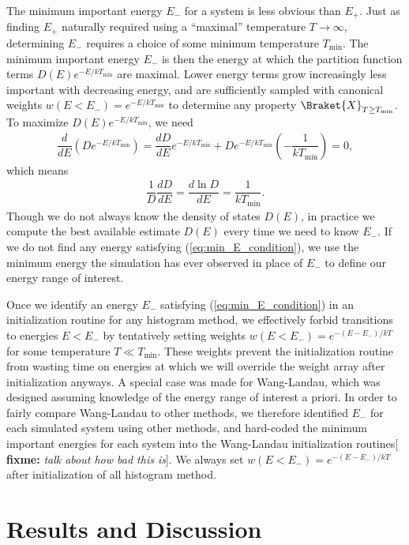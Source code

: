 \documentclass[11pt]{article}
\newcommand{\bk}{\Braket} %
\renewcommand{\t}{\text} %
\newcommand{\f}[2]{\dfrac{#1}{#2}} %
\newcommand{\p}[1]{\left(#1\right)} %
\newcommand{\red}[1]{{\bf \color{red} #1}}
\newcommand{\fixme}[1]{[\red{fixme:} \emph{#1}]}
\begin{document}
The minimum important energy $E_-$ for a system is less obvious than
$E_+$. Just as finding $E_+$ naturally required using a ``maximal''
temperature $T\to\infty$, determining $E_-$ requires a choice of some
minimum temperature $T_{\t{min}}$. The minimum important energy $E_-$
is then the energy at which the partition function terms
$D\p{E}e^{-E/kT_{\t{min}}}$ are maximal. Lower energy terms grow
increasingly less important with decreasing energy, and are
sufficiently sampled with canonical weights
$w\p{E<E_-}=e^{-E/kT_{\t{min}}}$ to determine any property
$\bk{X}_{T\ge T_{\t{min}}}$. To maximize $D\p{E}e^{-E/kT_{\t{min}}}$,
we need
\begin{align}
  \f{d}{dE}\p{De^{-E/kT_{\t{min}}}}
  =\f{dD}{dE}e^{-E/kT_{\t{min}}}+De^{-E/kT_{\t{min}}}\p{-\f{1}{kT_{\t{min}}}}=0,
  \label{eq:min_E_setup}
\end{align}
which means
\begin{align}
  \f1{D}\f{dD}{dE}=\f{d\ln D}{dE}=\f{1}{kT_{\t{min}}}.
  \label{eq:min_E_condition}
\end{align}
Though we do not always know the density of states $D\p{E}$, in
practice we compute the best available estimate $D\p{E}$ every time we
need to know $E_-$. If we do not find any energy satisfying
(\ref{eq:min_E_condition}), we use the minimum energy the simulation
has ever observed in place of $E_-$ to define our energy range of
interest.

Once we identify an energy $E_-$ satisfying (\ref{eq:min_E_condition})
in an initialization routine for any histogram method, we effectively
forbid transitions to energies $E<E_-$ by tentatively setting weights
$w\p{E<E_-}=e^{-\p{E-E_-}/kT}$ for some temperature $T\ll
T_{\t{min}}$. These weights prevent the initialization routine from
wasting time on energies at which we will override the weight array
after initialization anyways. A special case was made for Wang-Landau,
which was designed assuming knowledge of the energy range of interest
a priori. In order to fairly compare Wang-Landau to other methods, we
therefore identified $E_-$ for each simulated system using other
methods, and hard-coded the minimum important energies for each system
into the Wang-Landau initialization routines\fixme{talk about how bad
  this is}. We always set $w\p{E<E_-}=e^{-\p{E-E_-}/kT}$ after
initialization of all histogram method.


\section{Results and Discussion}
\label{sec:results}
\end{document}
